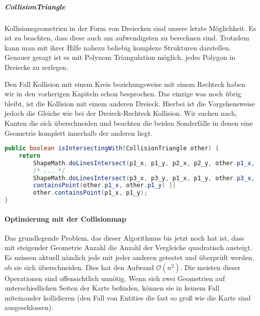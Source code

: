 \subparagraph{CollisionTriangle}

Kollisionsgeometrien in der Form von Dreiecken sind unsere letzte Möglichkeit. Es ist zu beachten, dass diese auch am aufwendigsten zu berechnen sind. Trotzdem kann man mit ihrer Hilfe nahezu beliebig komplexe Strukturen darstellen. Genauer gesagt ist es mit Polynom Triangulation möglich, jedes Polygon in Dreiecke zu zerlegen.  \cite[S 32]{KRAY}

Den Fall Kollision mit einem Kreis beziehungsweise mit einem Rechteck haben wir in den vorherigen Kapiteln schon besprochen. Das einzige was noch übrig bleibt, ist die Kollision mit einem anderen Dreieck. Hierbei ist die Vorgehensweise jedoch die Gleiche wie bei der Dreieck-Rechteck Kollision. Wir suchen nach, Kanten die sich überschneiden und beachten die beiden Sonderfälle in denen eine Geometrie komplett innerhalb der anderen liegt.

\doinline
\begin{lstlisting}[caption=Erkennen von Kollisionen (Dreieck-Dreieck), title=\hspace{0 pt}, language=java]
public boolean isIntersectingWith(CollisionTriangle other) {
	return
		ShapeMath.doLinesIntersect(p1_x, p1_y, p2_x, p2_y, other.p1_x, other.p1_y, other.p2_x, other.p2_y) ||
		/* ... */
		ShapeMath.doLinesIntersect(p3_x, p3_y, p1_x, p1_y, other.p3_x, other.p3_y, other.p1_x, other.p1_y) ||
		containsPoint(other.p1_x, other.p1_y) ||
		other.containsPoint(p1_x, p1_y);
}
\end{lstlisting}

\paragraph{Optimierung mit der Collisionmap}

Das grundlegende Problem, das dieser Algorithmus bis jetzt noch hat ist, dass mit steigender Geometrie Anzahl die Anzahl der Vergleiche quadratisch ansteigt. 
Es müssen aktuell nämlich jede  mit jeder anderen getestet und überprüft werden, ob sie sich überschneiden.
Dies hat den Aufwand $\mathcal O(n^2)$.
Die meisten dieser Operationen sind offensichtlich unnötig. Wenn sich zwei Geometrien auf unterschiedlichen Seiten der Karte befinden, können sie in keinem Fall miteinander kollidieren (den Fall von Entities die fast so groß wie die Karte sind ausgeschlossen).

